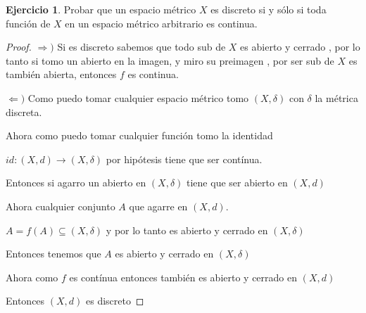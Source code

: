 \documentclass[11pt]{report}
\newcommand{\Ra}{\Rightarrow}
\newcommand{\ra}{\rightarrow}
\theoremstyle{definition}
\newtheorem{ej}{Ejercicio}
\begin{document}
	\begin{ej}
		
		Probar que un espacio métrico $X$ es discreto si y sólo si toda función de $X$ en un espacio métrico arbitrario es continua.

		\begin{proof}
			$\Ra )$ Si es discreto sabemos que todo sub de $X$ es abierto y cerrado , por lo tanto si tomo un abierto en la imagen, y miro su preimagen , por ser sub de $X$ es también abierta, entonces $f$ es continua.

			$\Leftarrow )$ Como puedo tomar cualquier espacio métrico tomo $(X,\delta)$ con $\delta$ la métrica discreta. 

			Ahora como puedo tomar cualquier función tomo la identidad

			$id: (X,d) \ra (X,\delta)$ por hipótesis tiene que ser contínua.

			Entonces si agarro un abierto en $(X,\delta)$ tiene que ser abierto en $(X,d)$

			Ahora cualquier conjunto $A$ que agarre en $(X,d)$.

			$A = f(A) \subseteq (X,\delta)$ y por lo tanto es abierto y cerrado en $(X,\delta)$ 


			Entonces tenemos que $A$ es abierto y cerrado en $(X,\delta)$

			Ahora como $f$ es contínua entonces también es abierto y cerrado en $(X,d)$

			Entonces $(X,d)$ es discreto



		\end{proof}
	\end{ej}
	
\end{document}
